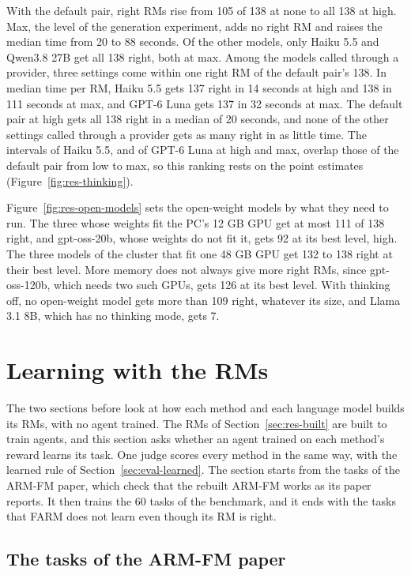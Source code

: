 \documentclass[11pt,english,listoffigures,listoftables]{tfgetsinf}
\begin{document}
With the default pair, right RMs rise from 105 of 138 at none to all 138 at high. Max, the level of the generation experiment, adds no right RM and raises the median time from 20 to 88 seconds. Of the other models, only Haiku 5.5 and Qwen3.8 27B get all 138 right, both at max. Among the models called through a provider, three settings come within one right RM of the default pair's 138. In median time per RM, Haiku 5.5 gets 137 right in 14 seconds at high and 138 in 111 seconds at max, and GPT-6 Luna gets 137 in 32 seconds at max. The default pair at high gets all 138 right in a median of 20 seconds, and none of the other settings called through a provider gets as many right in as little time. The intervals of Haiku 5.5, and of GPT-6 Luna at high and max, overlap those of the default pair from low to max, so this ranking rests on the point estimates (Figure~\ref{fig:res-thinking}).

Figure~\ref{fig:res-open-models} sets the open-weight models by what they need to run. The three whose weights fit the PC's 12 GB GPU get at most 111 of 138 right, and gpt-oss-20b, whose weights do not fit it, gets 92 at its best level, high. The three models of the cluster that fit one 48 GB GPU get 132 to 138 right at their best level. More memory does not always give more right RMs, since gpt-oss-120b, which needs two such GPUs, gets 126 at its best level. With thinking off, no open-weight model gets more than 109 right, whatever its size, and Llama 3.1 8B, which has no thinking mode, gets 7.

\section{Learning with the RMs}
\label{sec:res-learning}

The two sections before look at how each method and each language model builds its RMs, with no agent trained. The RMs of Section~\ref{sec:res-built} are built to train agents, and this section asks whether an agent trained on each method's reward learns its task. One judge scores every method in the same way, with the learned rule of Section~\ref{sec:eval-learned}. The section starts from the tasks of the ARM-FM paper, which check that the rebuilt ARM-FM works as its paper reports. It then trains the 60 tasks of the benchmark, and it ends with the tasks that FARM does not learn even though its RM is right.

\subsection{The tasks of the ARM-FM paper}
\label{sec:res-armfm-paper}
\end{document}

